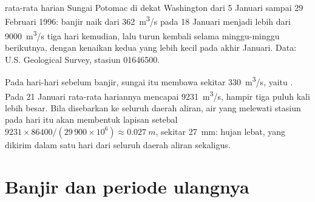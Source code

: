 \begin{omfigure}

{\small {} rata-rata harian Sungai Potomac di dekat Washington dari
5 Januari sampai 29 Februari 1996: banjir naik dari \qty{362}{m^3/s} pada
18 Januari menjadi lebih dari \qty{9000}{m^3/s} tiga hari kemudian, lalu turun
kembali selama minggu-minggu berikutnya, dengan kenaikan kedua yang lebih kecil
pada akhir Januari. Data: U.S. Geological Survey, stasiun 01646500.}
\end{omfigure}

Pada hari-hari sebelum banjir, sungai itu membawa sekitar \qty{330}{m^3/s},
yaitu . Pada 21 Januari rata-rata hariannya mencapai
\qty{9231}{m^3/s}, hampir tiga puluh kali lebih besar. Bila disebarkan ke
seluruh daerah aliran, air yang melewati stasiun pada hari itu akan membentuk
lapisan setebal
$9231 \times 86400 / (29\,900 \times 10^6) \approx \qty{0.027}{m}$, sekitar
\qty{27}{mm}: hujan lebat, yang dikirim dalam satu hari dari seluruh daerah
aliran sekaligus.

\section{Banjir dan periode ulangnya}

